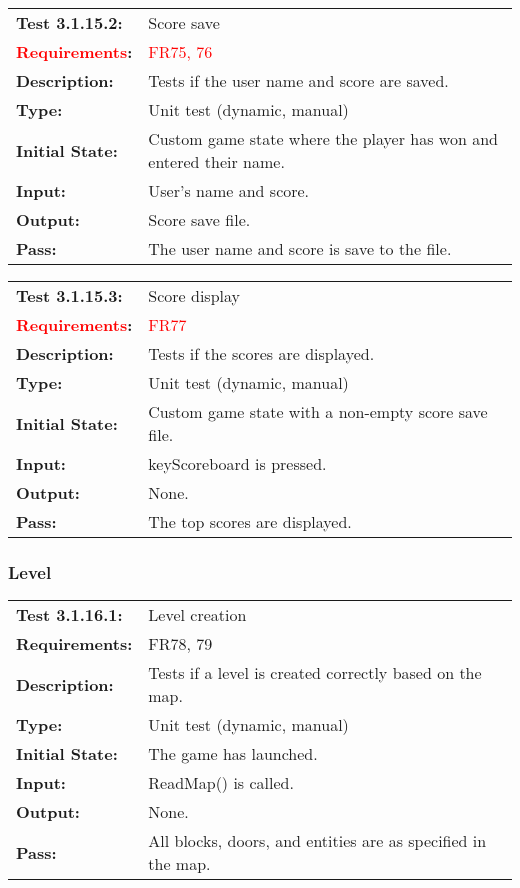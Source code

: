 \documentclass[12pt, titlepage]{article}
\begin{document}
\begin{tabular}{|l|p{10cm}|}
    \hline
    \bf{Test} 3.1.15.2: & Score save \\
    \bf{\textcolor{red}{Requirements}}: & \textcolor{red}{FR75, 76}\\
    \bf{Description}: & Tests if the user name and score are saved. \\
    \bf{Type}: & Unit test (dynamic, manual) \\
    \bf{Initial State}: & Custom game state where the player has won and entered their name. \\
    \bf{Input}: & User's name and score. \\
    \bf{Output}: & Score save file. \\
    \bf{Pass}: & The user name and score is save to the file. \\
    \hline
\end{tabular}

\begin{tabular}{|l|p{10cm}|}
    \hline
    \bf{Test} 3.1.15.3: & Score display \\
    \bf{\textcolor{red}{Requirements}}: & \textcolor{red}{FR77}\\
    \bf{Description}: & Tests if the scores are displayed. \\
    \bf{Type}: & Unit test (dynamic, manual) \\
    \bf{Initial State}: & Custom game state with a non-empty score save file. \\
    \bf{Input}: & keyScoreboard is pressed. \\
    \bf{Output}: & None. \\
    \bf{Pass}: & The top scores are displayed. \\
    \hline
\end{tabular}

\subsubsection{Level}

\begin{tabular}{|l|p{10cm}|}
    \hline
    \bf{Test} 3.1.16.1: & Level creation \\
    \bf{Requirements}: & FR78, 79 \\
    \bf{Description}: & Tests if a level is created correctly based on the map. \\
    \bf{Type}: & Unit test (dynamic, manual) \\
    \bf{Initial State}: & The game has launched. \\
    \bf{Input}: & ReadMap() is called. \\
    \bf{Output}: & None. \\
    \bf{Pass}: & All blocks, doors, and entities are as specified in the map. \\
    \hline
\end{tabular}
\end{document}
